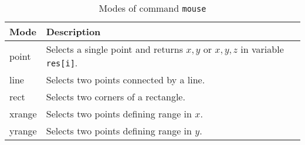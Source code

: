 %
\begin{table}[!t]
\centering
\begin{tabularx}{\textwidth}{|p{15mm}|X|}
  \hline
  {\bf Mode} & {\bf Description} \\
  \hline\hline
  point   & Selects a single point and returns $x,y$ or $x,y,z$ in
            variable {\tt res[i]}.\\
  line    & Selects two points connected by a line.\\
  rect    & Selects two corners of a rectangle.\\
  xrange  & Selects two points defining range in $x$.\\
  yrange  & Selects two points defining range in $y$.\\
  \hline
\end{tabularx}
\caption{\label{mou-tab1}Modes of command {\tt mouse}}
\end{table}
%

